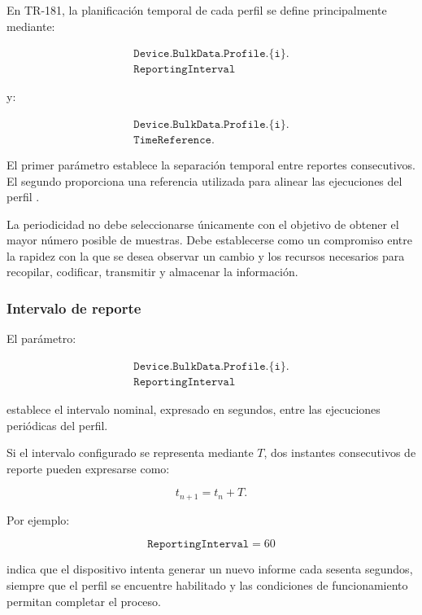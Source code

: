 En TR-181, la planificación temporal de cada perfil se define
principalmente mediante:

\[
\begin{split}
    \texttt{Device.BulkData.Profile.\{i\}.}\\
    \texttt{ReportingInterval}
\end{split}
\]

y:

\[
\begin{split}
    \texttt{Device.BulkData.Profile.\{i\}.}\\
    \texttt{TimeReference}.
\end{split}
\]

El primer parámetro establece la separación temporal entre reportes
consecutivos. El segundo proporciona una referencia utilizada para
alinear las ejecuciones del perfil \cite{bbf_tr181}.

La periodicidad no debe seleccionarse únicamente con el objetivo de
obtener el mayor número posible de muestras. Debe establecerse como un
compromiso entre la rapidez con la que se desea observar un cambio y los
recursos necesarios para recopilar, codificar, transmitir y almacenar la
información.


\subsubsection*{Intervalo de reporte}

El parámetro:

\[
\begin{split}
    \texttt{Device.BulkData.Profile.\{i\}.}\\
    \texttt{ReportingInterval}
\end{split}
\]

establece el intervalo nominal, expresado en segundos, entre las
ejecuciones periódicas del perfil.

Si el intervalo configurado se representa mediante \(T\), dos instantes
consecutivos de reporte pueden expresarse como:

\[
    t_{n+1}
    =
    t_n
    +
    T.
\]

Por ejemplo:

\[
    \texttt{ReportingInterval} = 60
\]

indica que el dispositivo intenta generar un nuevo informe cada sesenta
segundos, siempre que el perfil se encuentre habilitado y las condiciones
de funcionamiento permitan completar el proceso.


